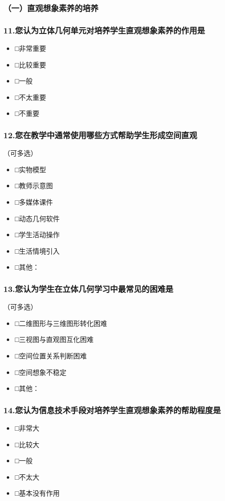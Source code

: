 \documentclass[UTF8,a4paper,12pt,twoside]{ctexart}
\begin{document}
\subsubsection*{（一）直观想象素养的培养}

\subsubsection*{11.您认为立体几何单元对培养学生直观想象素养的作用是}
\begin{itemize}
\item □非常重要
\item □比较重要
\item □一般
\item □不太重要
\item □不重要
\end{itemize}

\subsubsection*{12.您在教学中通常使用哪些方式帮助学生形成空间直观}
（可多选）
\begin{itemize}
\item □实物模型
\item □教师示意图
\item □多媒体课件
\item □动态几何软件
\item □学生活动操作
\item □生活情境引入
\item □其他：\underline{\hspace{2cm}}
\end{itemize}

\subsubsection*{13.您认为学生在立体几何学习中最常见的困难是}
（可多选）
\begin{itemize}
\item □二维图形与三维图形转化困难
\item □三视图与直观图互化困难
\item □空间位置关系判断困难
\item □空间想象不稳定
\item □其他：\underline{\hspace{2cm}}
\end{itemize}

\subsubsection*{14.您认为信息技术手段对培养学生直观想象素养的帮助程度是}
\begin{itemize}
\item □非常大
\item □比较大
\item □一般
\item □不太大
\item □基本没有作用
\end{itemize}
\end{document}

